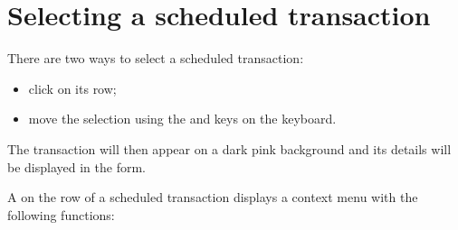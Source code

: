 	
\section{Selecting a scheduled transaction\label{plannedtransactions-selection}}

There are two ways to select a scheduled transaction:
\begin{itemize}
	\item click on its row;
	\item move the selection using the \keys{\arrowkeyup} and \keys{\arrowkeydown} keys on the keyboard.
\end{itemize}

The transaction will then appear on a \colorbox[RGB]{245,155,155}{dark pink background} and its details will be displayed in the form.

\vspace{2mm}
A  on the row of a scheduled transaction displays a context menu with the following functions:

